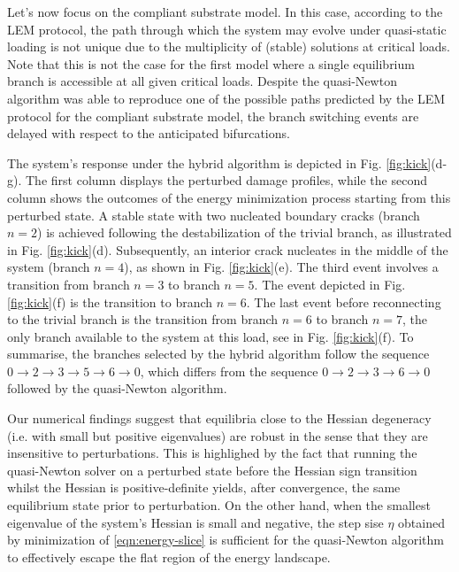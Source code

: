 \documentclass[10pt]{article}
\begin{document}
Let's now  focus on the compliant substrate model. In this case, according to the LEM protocol, the path through which the system may evolve under quasi-static loading is not unique due to the multiplicity of (stable) solutions at critical loads.
Note that this is not the case for the first model where a single equilibrium branch is accessible at all given critical loads.
Despite the quasi-Newton algorithm was able to reproduce one of the possible paths predicted by the LEM protocol for the compliant substrate model,  {the branch switching events} {are delayed with respect to the} anticipated bifurcations.

The system's response under the hybrid algorithm is depicted in Fig. \ref{fig:kick}(d-g). The first column displays the perturbed damage profiles, while the second column shows the outcomes of the energy minimization process starting from  this perturbed state. A stable state with two nucleated boundary cracks (branch \( n=2 \)) is achieved following the destabilization of the trivial branch, as illustrated in Fig. \ref{fig:kick}(d). Subsequently, an interior crack nucleates in the middle of the system (branch \( n=4 \)), as shown in Fig. \ref{fig:kick}(e). The third event involves a transition from branch \( n=3 \) to branch \( n=5 \). The  event depicted in Fig. \ref{fig:kick}(f) is the transition to branch \( n=6 \). The last event before reconnecting to the trivial branch is the transition from branch \( n=6 \) to branch \( n=7 \), the only  branch available to the system at this load, see in Fig. \ref{fig:kick}(f). To summarise, the branches selected by the hybrid algorithm follow the sequence
\( 0 \rightarrow 2 \rightarrow 3 \rightarrow 5 \rightarrow 6 \rightarrow 0 \),
which differs from the sequence
\( 0 \rightarrow 2 \rightarrow 3 \rightarrow 6 \rightarrow 0 \)
followed by the quasi-Newton algorithm.

Our numerical findings suggest that equilibria close to the Hessian degeneracy (i.e. with small but positive eigenvalues) are robust in the sense that they are insensitive to perturbations. This is highlighed by the fact that running the quasi-Newton solver on a perturbed state before the Hessian sign transition whilst the Hessian is positive-definite yields, after convergence, the same equilibrium state prior to perturbation.
On the other hand, when the smallest eigenvalue of the system's Hessian is small and negative, the step sise \( \eta \) obtained by minimization of \eqref{eqn:energy-slice} is sufficient for the quasi-Newton algorithm to effectively escape the flat region of the energy landscape.
\end{document}

